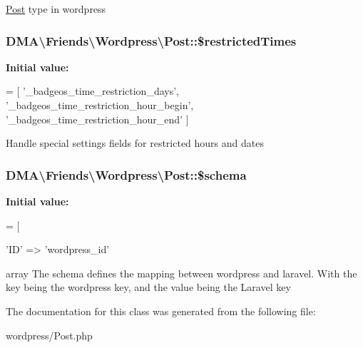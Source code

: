 \hyperlink{classDMA_1_1Friends_1_1Wordpress_1_1Post}{Post} type in wordpress \hypertarget{classDMA_1_1Friends_1_1Wordpress_1_1Post_ac0b74792fa83b0a9dafda52eec451e50}{
\subsubsection[{\$restricted\+Times}]{\setlength{\rightskip}{0pt plus 5cm}D\+M\+A\textbackslash{}\+Friends\textbackslash{}\+Wordpress\textbackslash{}\+Post\+::\$restricted\+Times\hspace{0.3cm}{\ttfamily [protected]}}}\label{classDMA_1_1Friends_1_1Wordpress_1_1Post_ac0b74792fa83b0a9dafda52eec451e50}
{\bfseries Initial value\+:}
\begin{DoxyCode}
= [
        \textcolor{stringliteral}{'\_badgeos\_time\_restriction\_days'},
        \textcolor{stringliteral}{'\_badgeos\_time\_restriction\_hour\_begin'},
        \textcolor{stringliteral}{'\_badgeos\_time\_restriction\_hour\_end'}
    ]
\end{DoxyCode}
Handle special settings fields for restricted hours and dates \hypertarget{classDMA_1_1Friends_1_1Wordpress_1_1Post_a38fc35f2a6a04046e386cfd3f3564d89}{
\subsubsection[{\$schema}]{\setlength{\rightskip}{0pt plus 5cm}D\+M\+A\textbackslash{}\+Friends\textbackslash{}\+Wordpress\textbackslash{}\+Post\+::\$schema}}\label{classDMA_1_1Friends_1_1Wordpress_1_1Post_a38fc35f2a6a04046e386cfd3f3564d89}
{\bfseries Initial value\+:}
\begin{DoxyCode}
= [
        
        \textcolor{stringliteral}{'ID'}                                            => \textcolor{stringliteral}{'wordpress\_id'}
\end{DoxyCode}
array The schema defines the mapping between wordpress and laravel. With the key being the wordpress key, and the value being the Laravel key 

The documentation for this class was generated from the following file\+:\begin{DoxyCompactItemize}
\item 
wordpress/Post.\+php\end{DoxyCompactItemize}

